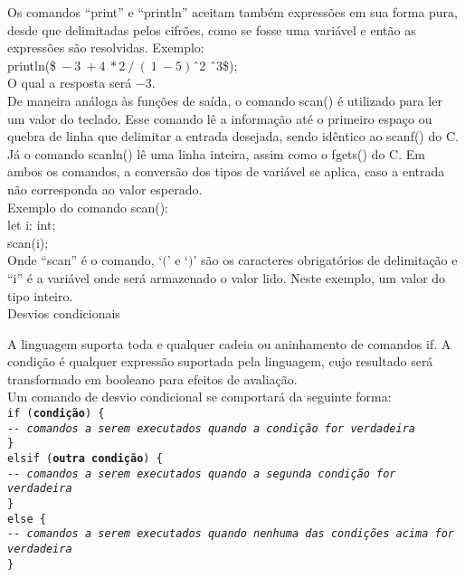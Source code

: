 \documentclass[12pt,a4paper]{article}
\def\emph#1{\textbf{#1}} %
\begin{document}
Os comandos ``print'' e ``println'' aceitam também expressões em sua forma pura, desde que delimitadas pelos cifrões, como se fosse uma variável e então as expressões são resolvidas. Exemplo: \\

println(\$$\ -3\ +4\ *2\ /\ (\ 1\ - 5)$\^\ 2 \^\ 3\$);\\

O qual a resposta será $-3$.\\

De maneira análoga às funções de saída, o comando scan() é utilizado para ler um valor do teclado. Esse comando lê a informação até o primeiro espaço ou quebra de linha que delimitar a entrada desejada, sendo idêntico ao scanf() do C. Já o comando scanln() lê uma linha inteira, assim como o fgets() do C. Em ambos os comandos, a conversão dos tipos de variável se aplica, caso a entrada não corresponda ao valor esperado.\\

Exemplo do comando scan(): \\

let i: int;\\

scan(i);\\

Onde ``scan'' é o comando, `$($' e `$)$' são os caracteres obrigatórios de delimitação e ``i'' é a variável onde será armazenado o valor lido. Neste exemplo, um valor do tipo inteiro.\\


\hypertarget{label4}{\Large{Desvios condicionais}}\\[0.3cm]
\normalsize

A linguagem suporta toda e qualquer cadeia ou aninhamento de comandos if. A condição é qualquer expressão suportada pela linguagem, cujo resultado será transformado em booleano para efeitos de avaliação.\\

Um comando de desvio condicional se comportará da seguinte forma: \\

\noindent\texttt{if (\emph{condição}) \{\\
\indent\textit{-{}- comandos a serem executados quando a condição for verdadeira} \\
\} \\
elsif (\emph{outra condição}) \{\\
\indent\textit{-{}- comandos a serem executados quando a segunda condição for verdadeira} \\
\} \\
else \{\\
\indent\textit{-{}- comandos a serem executados quando nenhuma das condições acima for verdadeira} \\
\}}\\
\end{document}
